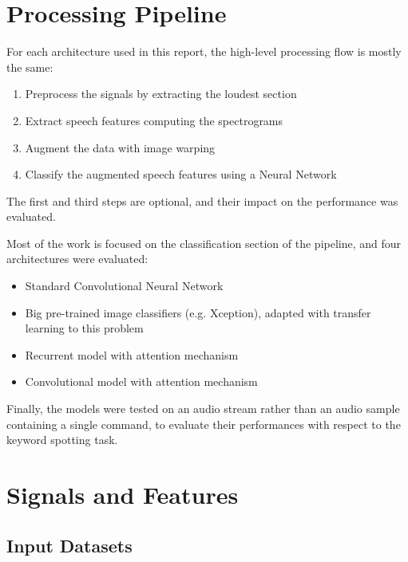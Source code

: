 
\section{Processing Pipeline}
\label{sec:processing_architecture}

For each architecture used in this report, the high-level processing flow is
mostly the same:
\begin{enumerate}
    \item Preprocess the signals by extracting the loudest section
    \item Extract speech features computing the spectrograms
    \item Augment the data with image warping
    \item Classify the augmented speech features using a Neural Network
\end{enumerate}
The first and third steps are optional, and their impact on the performance was
evaluated.

Most of the work is focused on the classification section of the pipeline, and
four architectures were evaluated:
\begin{itemize}
    \item Standard Convolutional Neural Network
    \item Big pre-trained image classifiers (e.g. Xception), adapted with
        transfer learning to this problem
    \item Recurrent model with attention mechanism
    \item Convolutional model with attention mechanism
\end{itemize}

Finally, the models were tested on an audio stream rather than an audio sample
containing a single command, to evaluate their performances with respect to
the keyword spotting task.

\section{Signals and Features}
\label{sec:model}

\subsection{Input Datasets}

